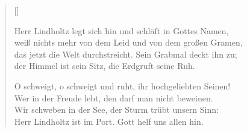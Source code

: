 \settowidth{\versewidth}{Herr Lindholtz legt sich hin und schläft in Gottes Namen,}
\begin{verse}[\versewidth]

 Herr Lindholtz legt sich hin und schläft in Gottes Namen,\\
weiß nichts mehr von dem Leid und von dem großen Gramen,\\
das jetzt die Welt durchstreicht. Sein Grabmal deckt ihn zu;\\
der Himmel ist sein Sitz, die Erdgruft seine Ruh.

 O schweigt, o schweigt und ruht, ihr hochgeliebten Seinen!\\
Wer in der Freude lebt, den darf man nicht beweinen.\\
Wir schweben in der See, der Sturm trübt unsern Sinn:\\
Herr Lindholtz ist im Port. Gott helf uns allen hin.

\end{verse} 
